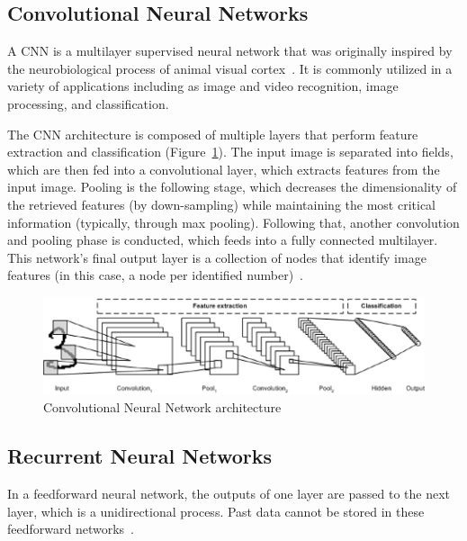 \subsection{Convolutional Neural Networks}

A \gls{CNN} is a multilayer supervised neural network that was originally inspired by the neurobiological process of animal visual cortex~\cite{Ganatra2018ATools}. It is commonly utilized in a variety of applications including as image and video recognition, image processing, and classification.

The \gls{CNN} architecture is composed of multiple layers that perform feature extraction and classification (Figure~\ref{fig:cnn}). The input image is separated into fields, which are then fed into a convolutional layer, which extracts features from the input image. Pooling is the following stage, which decreases the dimensionality of the retrieved features (by down-sampling) while maintaining the most critical information (typically, through max pooling). Following that, another convolution and pooling phase is conducted, which feeds into a fully connected multilayer. This network's final output layer is a collection of nodes that identify image features (in this case, a node per identified number)~\cite{Madhavan2021DeepDeveloper}.

\begin{figure}[htbp]
    \centering
    \includegraphics[width=\linewidth]{Chapters/Figures/cnn.png}
    \caption{Convolutional Neural Network architecture~\cite{Madhavan2021DeepDeveloper}}
    \label{fig:cnn}
\end{figure}

\subsection{Recurrent Neural Networks}

In a feedforward neural network, the outputs of one layer are passed to the next layer, which is a unidirectional process. Past data cannot be stored in these feedforward networks~\cite{Shewalkar2019PerformanceGRU}. 

